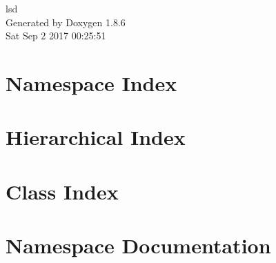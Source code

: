 \documentclass[twoside]{book}
\newcommand{\clearemptydoublepage}{%
  \newpage{\pagestyle{empty}\cleardoublepage}%
}
\begin{document}
\hypersetup{pageanchor=false}
\begin{titlepage}
\vspace*{7cm}
\begin{center}%
{\Large lsd }\\
\vspace*{1cm}
{\large Generated by Doxygen 1.8.6}\\
\vspace*{0.5cm}
{\small Sat Sep 2 2017 00:25:51}\\
\end{center}
\end{titlepage}
\clearemptydoublepage
\tableofcontents
\clearemptydoublepage
{}
\hypersetup{pageanchor=true}

\chapter{Namespace Index}

\chapter{Hierarchical Index}

\chapter{Class Index}

\chapter{Namespace Documentation}



\end{document}

